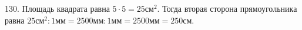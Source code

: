 130. Площадь квадрата равна $5\cdot5=25\text{см}^2.$ Тогда вторая сторона прямоугольника равна $25\text{см}^2:1\text{мм}=2500\text{мм}:1\text{мм}=2500\text{мм}=250\text{см}.$\\
